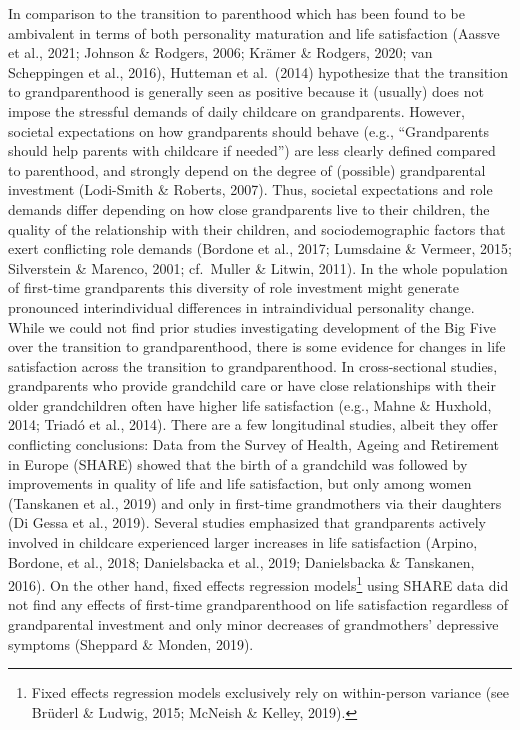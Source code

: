 \documentclass[
  english,
  man, noextraspace]{apa7}
\begin{document}
In comparison to the transition to parenthood which has been found to be ambivalent in terms of both personality maturation and life satisfaction (Aassve et al., 2021; Johnson \& Rodgers, 2006; Krämer \& Rodgers, 2020; van Scheppingen et al., 2016), Hutteman et al.~(2014) hypothesize that the transition to grandparenthood is generally seen as positive because it (usually) does not impose the stressful demands of daily childcare on grandparents. However, societal expectations on how grandparents should behave (e.g., \enquote{Grandparents should help parents with childcare if needed}) are less clearly defined compared to parenthood, and strongly depend on the degree of (possible) grandparental investment (Lodi-Smith \& Roberts, 2007). Thus, societal expectations and role demands differ depending on how close grandparents live to their children, the quality of the relationship with their children, and sociodemographic factors that exert conflicting role demands (Bordone et al., 2017; Lumsdaine \& Vermeer, 2015; Silverstein \& Marenco, 2001; cf.~Muller \& Litwin, 2011). In the whole population of first-time grandparents this diversity of role investment might generate pronounced interindividual differences in intraindividual personality change.\\
While we could not find prior studies investigating development of the Big Five over the transition to grandparenthood, there is some evidence for changes in life satisfaction across the transition to grandparenthood. In cross-sectional studies, grandparents who provide grandchild care or have close relationships with their older grandchildren often have higher life satisfaction (e.g., Mahne \& Huxhold, 2014; Triadó et al., 2014). There are a few longitudinal studies, albeit they offer conflicting conclusions: Data from the Survey of Health, Ageing and Retirement in Europe (SHARE) showed that the birth of a grandchild was followed by improvements in quality of life and life satisfaction, but only among women (Tanskanen et al., 2019) and only in first-time grandmothers via their daughters (Di Gessa et al., 2019). Several studies emphasized that grandparents actively involved in childcare experienced larger increases in life satisfaction (Arpino, Bordone, et al., 2018; Danielsbacka et al., 2019; Danielsbacka \& Tanskanen, 2016). On the other hand, fixed effects regression models\footnote{Fixed effects regression models exclusively rely on within-person variance (see Brüderl \& Ludwig, 2015; McNeish \& Kelley, 2019).} using SHARE data did not find any effects of first-time grandparenthood on life satisfaction regardless of grandparental investment and only minor decreases of grandmothers' depressive symptoms (Sheppard \& Monden, 2019).\\
\end{document}
